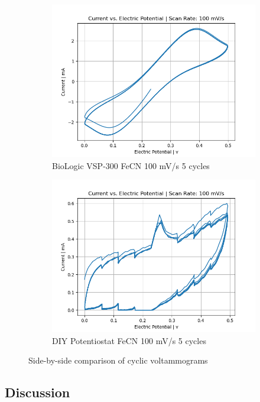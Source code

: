 \documentclass{article}
\begin{document}
\begin{figure}[H]
  \begin{subfigure}[b]{0.45\textwidth}
    \includegraphics[width=\textwidth]{FECN_100mVs_5cycles_lab.png}
    \caption{BioLogic VSP-300 FeCN 100 mV/s 5 cycles}
  \end{subfigure}
  \hfill
  \begin{subfigure}[b]{0.45\textwidth}
    \includegraphics[width=\textwidth]{FECN_100mVs_5cycles.png}
    \caption{DIY Potentiostat FeCN 100 mV/s 5 cycles}
  \end{subfigure}
  
  \caption{Side-by-side comparison of cyclic voltammograms}
\end{figure}

\subsection*{Discussion}
\end{document}
